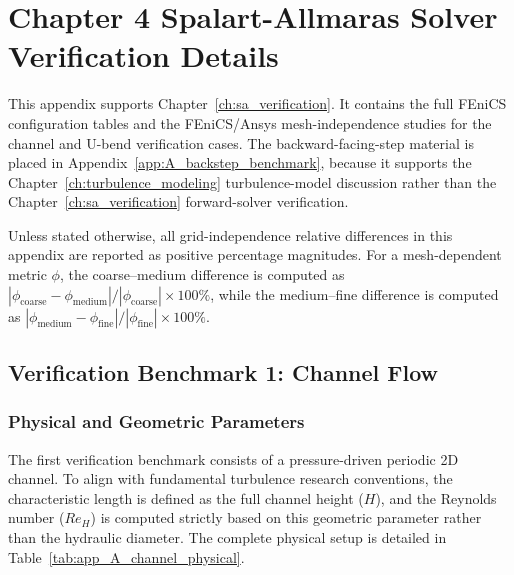 \chapter{Chapter 4 Spalart-Allmaras Solver Verification Details}
\label{app:B_sa_solver_verification}

This appendix supports Chapter~\ref{ch:sa_verification}. It contains the full FEniCS configuration tables and the FEniCS/Ansys mesh-independence studies for the channel and U-bend verification cases. The backward-facing-step material is placed in Appendix~\ref{app:A_backstep_benchmark}, because it supports the Chapter~\ref{ch:turbulence_modeling} turbulence-model discussion rather than the Chapter~\ref{ch:sa_verification} forward-solver verification.

Unless stated otherwise, all grid-independence relative differences in this appendix are reported as positive percentage magnitudes. For a mesh-dependent metric $\phi$, the coarse--medium difference is computed as $|\phi_{\mathrm{coarse}}-\phi_{\mathrm{medium}}|/|\phi_{\mathrm{coarse}}|\times100\%$, while the medium--fine difference is computed as $|\phi_{\mathrm{medium}}-\phi_{\mathrm{fine}}|/|\phi_{\mathrm{fine}}|\times100\%$.

\section{Verification Benchmark 1: Channel Flow}
\label{sec:app_A_channel}

\subsection{Physical and Geometric Parameters}
\label{subsec:app_A_channel_physical}
The first verification benchmark consists of a pressure-driven periodic 2D channel. To align with fundamental turbulence research conventions, the characteristic length is defined as the full channel height ($H$), and the Reynolds number ($Re_H$) is computed strictly based on this geometric parameter rather than the hydraulic diameter. The complete physical setup is detailed in Table~\ref{tab:app_A_channel_physical}.

